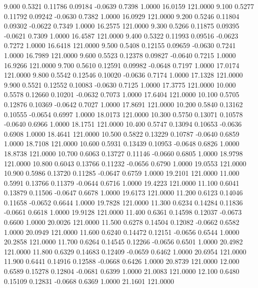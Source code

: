    9.000   0.5321   0.11786   0.09184  -0.0639   0.7398   1.0000  16.0159 121.0000
   9.100   0.5277   0.11792   0.09242  -0.0630   0.7382   1.0000  16.0929 121.0000
   9.200   0.5246   0.11804   0.09302  -0.0622   0.7349   1.0000  16.2575 121.0000
   9.300   0.5266   0.11875   0.09395  -0.0621   0.7309   1.0000  16.4587 121.0000
   9.400   0.5322   0.11993   0.09516  -0.0623   0.7272   1.0000  16.6418 121.0000
   9.500   0.5408   0.12155   0.09659  -0.0630   0.7241   1.0000  16.7989 121.0000
   9.600   0.5523   0.12378   0.09827  -0.0640   0.7215   1.0000  16.9266 121.0000
   9.700   0.5610   0.12591   0.09982  -0.0648   0.7197   1.0000  17.0174 121.0000
   9.800   0.5542   0.12546   0.10020  -0.0636   0.7174   1.0000  17.1328 121.0000
   9.900   0.5521   0.12552   0.10083  -0.0630   0.7125   1.0000  17.3775 121.0000
  10.000   0.5578   0.12660   0.10201  -0.0632   0.7073   1.0000  17.6404 121.0000
  10.100   0.5705   0.12876   0.10369  -0.0642   0.7027   1.0000  17.8691 121.0000
  10.200   0.5840   0.13162   0.10555  -0.0654   0.6997   1.0000  18.0173 121.0000
  10.300   0.5750   0.13071   0.10578  -0.0640   0.6966   1.0000  18.1751 121.0000
  10.400   0.5747   0.13094   0.10653  -0.0636   0.6908   1.0000  18.4641 121.0000
  10.500   0.5822   0.13229   0.10787  -0.0640   0.6859   1.0000  18.7108 121.0000
  10.600   0.5931   0.13439   0.10953  -0.0648   0.6826   1.0000  18.8738 121.0000
  10.700   0.6063   0.13727   0.11146  -0.0660   0.6805   1.0000  18.9798 121.0000
  10.800   0.6043   0.13766   0.11232  -0.0656   0.6790   1.0000  19.0553 121.0000
  10.900   0.5986   0.13720   0.11285  -0.0647   0.6759   1.0000  19.2101 121.0000
  11.000   0.5991   0.13766   0.11379  -0.0644   0.6716   1.0000  19.4223 121.0000
  11.100   0.6041   0.13879   0.11506  -0.0647   0.6678   1.0000  19.6173 121.0000
  11.200   0.6123   0.14046   0.11658  -0.0652   0.6644   1.0000  19.7828 121.0000
  11.300   0.6234   0.14284   0.11836  -0.0661   0.6618   1.0000  19.9128 121.0000
  11.400   0.6361   0.14598   0.12037  -0.0673   0.6600   1.0000  20.0026 121.0000
  11.500   0.6278   0.14504   0.12082  -0.0662   0.6582   1.0000  20.0949 121.0000
  11.600   0.6240   0.14472   0.12151  -0.0656   0.6544   1.0000  20.2858 121.0000
  11.700   0.6264   0.14545   0.12266  -0.0656   0.6501   1.0000  20.4982 121.0000
  11.800   0.6329   0.14683   0.12409  -0.0659   0.6462   1.0000  20.6954 121.0000
  11.900   0.6441   0.14916   0.12588  -0.0668   0.6426   1.0000  20.8739 121.0000
  12.000   0.6589   0.15278   0.12804  -0.0681   0.6399   1.0000  21.0083 121.0000
  12.100   0.6480   0.15109   0.12831  -0.0668   0.6369   1.0000  21.1601 121.0000
